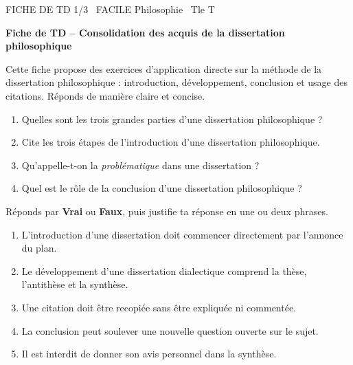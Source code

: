 \documentclass[11pt]{article}
\begin{document}
\begin{tcolorbox}[enhanced,colback=popink,colframe=popink,arc=10pt,boxrule=0pt,left=12pt,right=12pt,top=9pt,bottom=9pt]
{\color{white}\popxbold\small FICHE DE TD 1/3 \textbullet\ FACILE \hfill Philosophie \textbullet\ Tle T\par}
\end{tcolorbox}
\vspace{4pt}
\textbf{Fiche de TD -- Consolidation des acquis de la dissertation philosophique}

\smallskip
Cette fiche propose des exercices d'application directe sur la méthode de la dissertation philosophique : introduction, développement, conclusion et usage des citations. Réponds de manière claire et concise.

\begin{exercice}
\begin{enumerate}
  \item Quelles sont les trois grandes parties d'une dissertation philosophique ?
  \item Cite les trois étapes de l'introduction d'une dissertation philosophique.
  \item Qu'appelle-t-on la \emph{problématique} dans une dissertation ?
  \item Quel est le rôle de la conclusion d'une dissertation philosophique ?
\end{enumerate}
\end{exercice}

\begin{exercice}
Réponds par \textbf{Vrai} ou \textbf{Faux}, puis justifie ta réponse en une ou deux phrases.
\begin{enumerate}
  \item L'introduction d'une dissertation doit commencer directement par l'annonce du plan.
  \item Le développement d'une dissertation dialectique comprend la thèse, l'antithèse et la synthèse.
  \item Une citation doit être recopiée sans être expliquée ni commentée.
  \item La conclusion peut soulever une nouvelle question ouverte sur le sujet.
  \item Il est interdit de donner son avis personnel dans la synthèse.
\end{enumerate}
\end{exercice}
\end{document}
